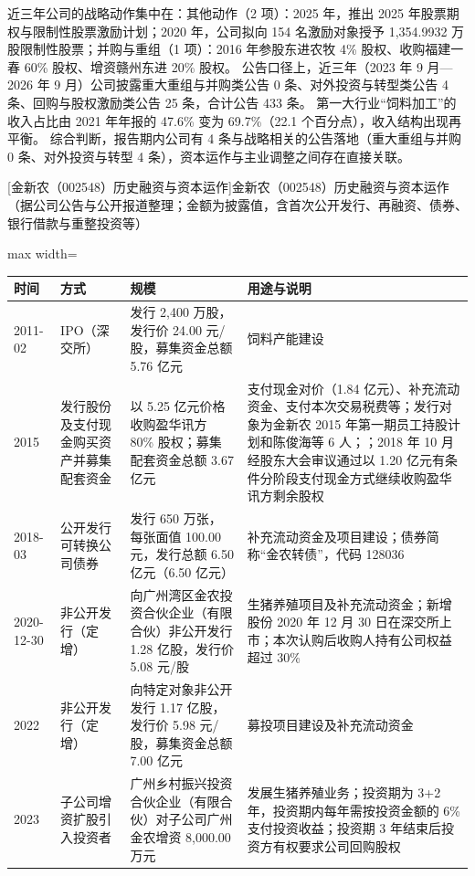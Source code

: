  近三年公司的战略动作集中在：其他动作（2 项）：2025 年，推出 2025 年股票期权与限制性股票激励计划；2020 年，公司拟向 154 名激励对象授予 1,354.9932 万股限制性股票；并购与重组（1 项）：2016 年参股东进农牧 4\% 股权、收购福建一春 60\% 股权、增资赣州东进 20\% 股权。 公告口径上，近三年（2023 年 9 月---2026 年 9 月）公司披露重大重组与并购类公告 0 条、对外投资与转型类公告 4 条、回购与股权激励类公告 25 条，合计公告 433 条。 第一大行业“饲料加工”的收入占比由 2021 年年报的 47.6\% 变为 69.7\%（22.1 个百分点），收入结构出现再平衡。 综合判断，报告期内公司有 4 条与战略相关的公告落地（重大重组与并购 0 条、对外投资与转型 4 条），资本运作与主业调整之间存在直接关联。

\begin{center}\small\setlength{\tabcolsep}{4pt}
[金新农（002548）历史融资与资本运作]{金新农（002548）历史融资与资本运作（据公司公告与公开报道整理；金额为披露值，含首次公开发行、再融资、债券、银行借款与重整投资等）}
\begin{adjustbox}{max width=\textwidth}
\begin{tabular}{@{}p{1.45cm}p{2.55cm}p{4.05cm}p{4.95cm}@{}}
\toprule
时间 & 方式 & 规模 & 用途与说明 \\
\midrule
2011-02 & IPO（深交所） & 发行 2,\allowbreak{}400 万股，\allowbreak{}发行价 24.00 元/\allowbreak{}股，\allowbreak{}募集资金总额 5.76 亿元 & 饲料产能建设 \\
2015 & 发行股份及支付现金购买资产并募集配套资金 & 以 5.25 亿元价格收购盈华讯方 80\% 股权；募集配套资金总额 3.67 亿元 & 支付现金对价（1.84 亿元）、\allowbreak{}补充流动资金、\allowbreak{}支付本次交易税费等；发行对象为金新农 2015 年第一期员工持股计划和陈俊海等 6 人；；2018 年 10 月经股东大会审议通过以 1.20 亿元有条件分阶段支付现金方式继续收购盈华讯方剩余股权 \\
2018-03 & 公开发行可转换公司债券 & 发行 650 万张，\allowbreak{}每张面值 100.00 元，\allowbreak{}发行总额 6.50 亿元（6.50 亿元） & 补充流动资金及项目建设；债券简称“金农转债”，\allowbreak{}代码 128036 \\
2020-12-30 & 非公开发行（定增） & 向广州湾区金农投资合伙企业（有限合伙）非公开发行 1.28 亿股，\allowbreak{}发行价 5.08 元/\allowbreak{}股 & 生猪养殖项目及补充流动资金；新增股份 2020 年 12 月 30 日在深交所上市；本次认购后收购人持有公司权益超过 30\% \\
2022 & 非公开发行（定增） & 向特定对象非公开发行 1.17 亿股，\allowbreak{}发行价 5.98 元/\allowbreak{}股，\allowbreak{}募集资金总额 7.00 亿元 & 募投项目建设及补充流动资金 \\
2023 & 子公司增资扩股引入投资者 & 广州乡村振兴投资合伙企业（有限合伙）对子公司广州金农增资 8,\allowbreak{}000.00 万元 & 发展生猪养殖业务；投资期为 3+2 年，\allowbreak{}投资期内每年需按投资金额的 6\% 支付投资收益；投资期 3 年结束后投资方有权要求公司回购股权 \\
\bottomrule
\end{tabular}
\end{adjustbox}
\end{center}

